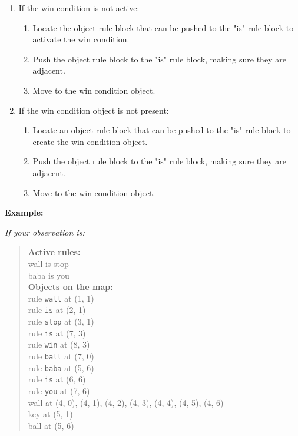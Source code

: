 \begin{GreenBox}
\begin{enumerate}
		\item If the win condition is not active:
			\begin{enumerate}
				\item Locate the object rule block that can be pushed to the "is" rule block
					to activate the win condition.

				\item Push the object rule block to the "is" rule block, making sure
					they are adjacent.

				\item Move to the win condition object.
			\end{enumerate}

		\item If the win condition object is not present:
			\begin{enumerate}
				\item Locate an object rule block that can be pushed to the "is" rule block
					to create the win condition object.

				\item Push the object rule block to the "is" rule block, making sure
					they are adjacent.

				\item Move to the win condition object.
			\end{enumerate}
	\end{enumerate}

	\textbf{Example:}

	\textit{If your observation is:}
	\begin{quote}
		\textbf{Active rules:} \\ wall is stop \\ baba is you \\

		\textbf{Objects on the map:} \\ rule \texttt{wall} at (1, 1) \\ rule \texttt{is}
		at (2, 1) \\ rule \texttt{stop} at (3, 1) \\ rule \texttt{is} at (7, 3) \\
		rule \texttt{win} at (8, 3) \\ rule \texttt{ball} at (7, 0) \\ rule \texttt{baba}
		at (5, 6) \\ rule \texttt{is} at (6, 6) \\ rule \texttt{you} at (7, 6) \\
		wall at (4, 0), (4, 1), (4, 2), (4, 3), (4, 4), (4, 5), (4, 6) \\ key at (5,
		1) \\ ball at (5, 6) \\


\end{quote}
\end{GreenBox}
